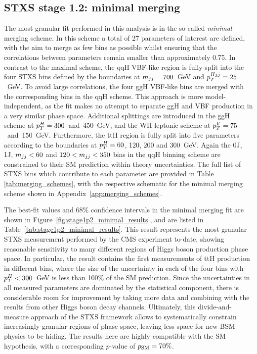 \subsection{STXS stage 1.2: minimal merging}
The most granular fit performed in this analysis is in the so-called \textit{minimal} merging scheme. In this scheme a total of 27 parameters of interest are defined, with the aim to merge as few bins as possible whilst ensuring that the correlations between parameters remain smaller than approximately 0.75. In contrast to the maximal scheme, the qqH VBF-like region is fully split into the four STXS bins defined by the boundaries at $m_{jj}=700$~GeV and $p_T^{Hjj}=25$~GeV. To avoid large correlations, the four ggH VBF-like bins are merged with the corresponding bins in the qqH scheme. This approach is more model-independent, as the fit makes no attempt to separate ggH and VBF production in a very similar phase space. Additional splittings are introduced in the ggH scheme at $p_T^H=300$~and~450~GeV, and the WH leptonic scheme at $p_T^V=75$~and~150~GeV. Furthermore, the ttH region is fully split into five parameters according to the boundaries at $p_T^H=60$, 120, 200 and 300~GeV. Again the 0J, 1J, $m_{jj}<60$ and $120<m_{jj}<350$ bins in the qqH binning scheme are constrained to their SM prediction within theory uncertainties. The full list of STXS bins which contribute to each parameter are provided in Table \ref{tab:merging_schemes}, with the respective schematic for the minimal merging scheme shown in Appendix~\ref{app:merging_schemes}.

The \xsbr best-fit values and 68\% confidence intervals in the minimal merging fit are shown in Figure~\ref{fig:stage1p2_minimal_results}, and are listed in Table~\ref{tab:stage1p2_minimal_results}. This result represents the most granular STXS measurement performed by the CMS experiment to-date, showing reasonable sensitivity to many different regions of Higgs boson production phase space. In particular, the result contains the first measurements of ttH production in different bins, where the size of the uncertainty in each of the four bins with $p_T^H<300$~GeV is less than 100\% of the SM prediction. Since the uncertainties in all measured parameters are dominated by the statistical component, there is considerable room for improvement by taking more data and combining with the results from other Higgs boson decay channels. Ultimately, this divide-and-measure approach of the STXS framework allows to systematically constrain increasingly granular regions of phase space, leaving less space for new BSM physics to be hiding. The results here are highly compatible with the SM hypothesis, with a corresponding $p$-value of $p_{\rm{SM}}=70\%$.

